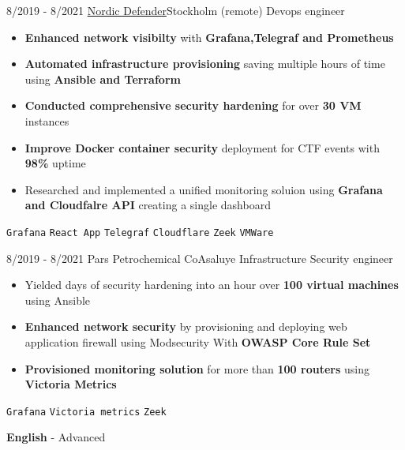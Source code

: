 \documentclass[9pt]{developercv} %
\begin{document}
\begin{center}
\end{center}
\vspace{5pt}
\begin{entrylist}
    \entry
    {8/2019 - 8/2021}
    {\href{https://nordicdefender.com/}{Nordic Defender}\newline\small\textnormal{Stockholm (remote)}}
    {Devops engineer}
    {\vspace{-6pt}
        \begin{itemize}[itemsep=2pt,topsep=0pt,parsep=0pt,partopsep=0pt, leftmargin=-1pt]
            \item{\textbf{Enhanced network visibilty} with \textbf{Grafana,Telegraf and Prometheus}}
            \item{\textbf{Automated infrastructure provisioning} saving multiple hours of time using \textbf{Ansible and Terraform}}
            \item{\textbf{Conducted comprehensive security hardening} for over \textbf{30 VM} instances}
            \item{\textbf{Improve Docker container security} deployment for CTF events with \textbf{98\%} uptime}
            \item{Researched and implemented a unified monitoring soluion using \textbf{Grafana and Cloudfalre API} creating a single dashboard}
        \end{itemize}
        \texttt{Grafana} \slashsep \texttt{React App} \slashsep \texttt{Telegraf} \slashsep \texttt{Cloudflare} \slashsep \texttt{Zeek} \slashsep \texttt{VMWare}}
\end{entrylist}

\begin{center}
\end{center}
\vspace{5pt}
\begin{entrylist}
    \entry
    {8/2019 - 8/2021}
    {{Pars Petrochemical Co}\newline\small\textnormal{Asaluye}}
    {Infrastructure Security engineer}
    {\vspace{-6pt}
        \begin{itemize}[itemsep=2pt,topsep=0pt,parsep=0pt,partopsep=0pt, leftmargin=-1pt]
            \item{Yielded days of security hardening into an hour over \textbf{100 virtual machines} using Ansible}
            \item{\textbf{Enhanced network security} by provisioning and deploying web
                  application firewall using Modsecurity With \textbf{OWASP Core Rule Set}}
            \item{\textbf{Provisioned monitoring solution} for more than \textbf{100 routers} using \textbf{Victoria Metrics}}

        \end{itemize}
        \texttt{Grafana} \slashsep \texttt{Victoria metrics}  \slashsep \texttt{Zeek} }
\end{entrylist}
\vspace{-10 pt}
\vspace{-6pt}

\hspace{26mm} \textbf{English} - Advanced
\end{document}
